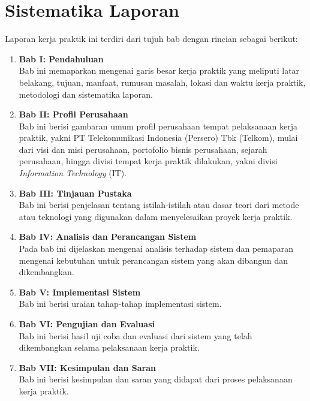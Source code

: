 \section{Sistematika Laporan}
\tab Laporan kerja praktik ini terdiri dari tujuh bab dengan rincian sebagai berikut:
\begin{enumerate}
	\item \textbf{Bab I: Pendahuluan}\\
	\tab Bab ini memaparkan mengenai garis besar kerja praktik yang meliputi latar belakang, tujuan, manfaat, rumusan masalah, lokasi dan waktu kerja praktik, metodologi dan sistematika laporan.\\
		
	\item \textbf{Bab II: Profil Perusahaan}\\
	\tab Bab ini berisi gambaran umum profil perusahaan tempat pelaksanaan kerja praktik, yakni PT Telekomunikasi Indonesia (Persero) Tbk (Telkom), mulai dari visi dan misi perusahaan, portofolio bisnis perusahaan, sejarah perusahaan, hingga divisi tempat kerja praktik dilakukan, yakni divisi \textit{Information Technology} (IT).\\
		
	\item \textbf{Bab III: Tinjauan Pustaka}\\
	\tab Bab ini berisi penjelasan tentang istilah-istilah atau dasar teori dari metode atau teknologi yang digunakan dalam menyelesaikan proyek kerja praktik.\\
		
	\item \textbf{Bab IV: Analisis dan Perancangan Sistem}\\
	\tab Pada bab ini dijelaskan mengenai analisis terhadap sistem dan pemaparan mengenai kebutuhan untuk perancangan sistem yang akan dibangun dan dikembangkan.\\
	
	\item \textbf{Bab V: Implementasi Sistem}\\
	\tab Bab ini berisi uraian tahap-tahap implementasi sistem.\\
		
	\item \textbf{Bab VI: Pengujian dan Evaluasi}\\
	\tab Bab ini berisi hasil uji coba dan evaluasi dari sistem yang telah dikembangkan selama pelaksanaan kerja praktik.\\
	
	\item \textbf{Bab VII: Kesimpulan dan Saran}\\	
	\tab Bab ini berisi kesimpulan dan saran yang didapat dari proses pelaksanaan kerja praktik.\\
\end{enumerate}

\cleardoublepage
